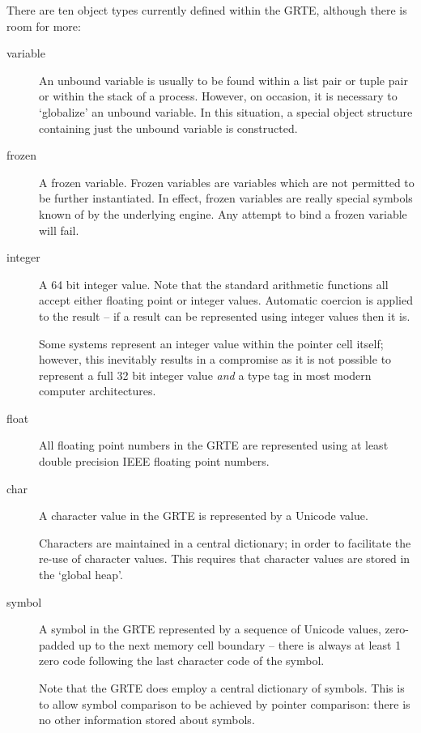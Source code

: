 There are ten object types currently defined within the GRTE, although there is room for more:
\begin{description}
\item[variable]
An unbound variable is usually to be found within a list pair or tuple pair or within the stack of a process. However, on occasion, it is necessary to `globalize' an unbound variable. In this situation, a special object structure containing just the unbound variable is constructed.

\item[frozen]
A frozen variable. Frozen variables are variables which are not permitted to be further instantiated. In effect, frozen variables are really special symbols known of by the underlying engine. Any attempt to bind a frozen variable will fail.

\item[integer]
A 64 bit integer value. Note that the standard arithmetic functions all accept either floating point or integer values. Automatic coercion is applied to the result -- if a result can be represented using integer values then it is.

Some \prolog systems represent an integer value within the pointer cell itself; however, this inevitably results in a compromise as it is not possible to represent a full 32 bit integer value \emph{and} a type tag in most modern computer architectures.

\item[float]
All floating point numbers in the GRTE are represented using at least double precision IEEE floating point numbers. 

\item[char]
A character value in the GRTE is represented by a Unicode value. 

Characters are maintained in a central dictionary; in order to facilitate the re-use of character values. This requires that character values are stored in the `global heap'.

\item[symbol]
A symbol in the GRTE represented by a sequence of Unicode values, zero-padded up to the next memory cell boundary -- there is always at least 1 zero code following the last character code of the symbol.

Note that the GRTE does employ a central dictionary of symbols. This is to allow symbol comparison to be achieved by pointer comparison: there is no other information stored about symbols.


\end{description}
